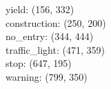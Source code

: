 yield: (156, 332) \\
construction: (250, 200) \\
no_entry: (344, 444) \\
traffic_light: (471, 359) \\
stop: (647, 195) \\
warning: (799, 350)

